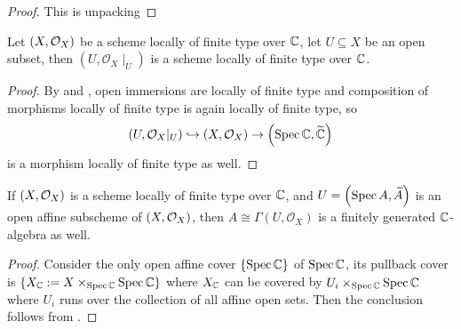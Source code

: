 \begin{proof}
    This is unpacking 
\end{proof}


\begin{proposition}
  \leanok{}
  Let $\left(X, \mathcal{O}_{X}\right)$ be a scheme locally of finite type over $\mathbb{C}$, let $U \subseteq X$ be an open subset, then $(U, \mathcal{O}_{X}\mid_{U})$ is a scheme locally of finite type over $\mathbb{C}$.
  \label{thm:restriction-of-scheme-of-finite-type-is-scheme-of-finite-type}
\end{proposition}
\begin{proof}
  By  and , open immersions are locally of finite type and composition of morphisms locally of finite type is again locally of finite type, so
  \[
    \left(U, \mathcal{O}_{X}|_{U}\right) \hookrightarrow \left(X, \mathcal{O}_{X}\right) \to \left(\operatorname*{Spec}{\mathbb{C}}, \widetilde{\mathbb{C}}\right)
  \]
  is a morphism locally of finite type as well.
\end{proof}

\begin{proposition}\label{thm:affine-open-is-finite-algebra}
  If $\left(X, \mathcal{O}_{X}\right)$ is a scheme locally of finite type over $\mathbb{C}$, and $U = \left(\operatorname*{Spec}{A}, \widetilde{A}\right)$ is an open affine subscheme of $\left(X, \mathcal{O}_{X}\right)$, then $A \cong \Gamma(U, \mathcal{O}_{X})$ is a finitely generated $\mathbb{C}$-algebra as well.
  \leanok
\end{proposition}

\begin{proof}
  Consider the only open affine cover $\{\operatorname{Spec} \mathbb{C}\}$ of $\operatorname{Spec} \mathbb{C}$, its pullback cover is $\{X_{\mathbb{C}} := X \times_{\operatorname{Spec}\mathbb{C}} \operatorname{Spec}\mathbb{C}\}$ where $X_{\mathbb{C}}$ can be covered by $U_{i}\times_{\operatorname{Spec} \mathbb{C}}\operatorname{Spec} \mathbb{C}$ where $U_{i}$ runs over the collection of all affine open sets.
  Then the conclusion follows from .

\end{proof}

